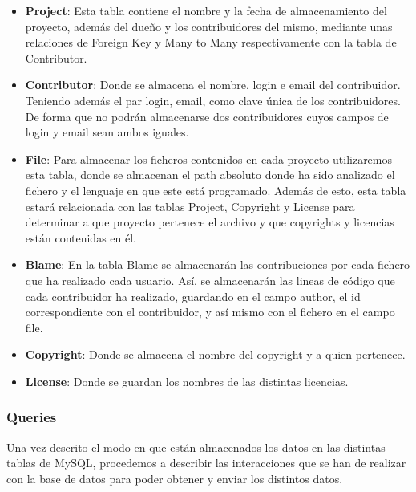 \documentclass[a4paper, spanish, 12pt]{book}
\begin{document}
\begin{itemize}

\item \textbf{Project}: Esta tabla contiene el nombre y la fecha de almacenamiento
del proyecto, adem\'as del due\~no y los contribuidores del mismo, mediante unas relaciones
de Foreign Key y Many to Many respectivamente con la tabla de Contributor.

\item \textbf{Contributor}: Donde se almacena el nombre, login e email del contribuidor.
Teniendo adem\'as el par login, email, como clave \'unica de los contribuidores. De forma
que no podr\'an almacenarse dos contribuidores cuyos campos de login y email sean
ambos iguales.

\item \textbf{File}: Para almacenar los ficheros contenidos en cada proyecto
utilizaremos esta tabla, donde se almacenan el path absoluto donde ha sido analizado
el fichero y el lenguaje en que este est\'a programado. Adem\'as de esto, esta tabla
estar\'a relacionada con las tablas Project, Copyright y License para determinar
a que proyecto pertenece el archivo y que copyrights y licencias est\'an contenidas
en \'el.

\item \textbf{Blame}: En la tabla Blame se almacenar\'an las contribuciones por cada
fichero que ha realizado cada usuario. As\'i, se almacenar\'an las lineas de
c\'odigo que cada contribuidor ha realizado, guardando en el campo author, el id correspondiente con
el contribuidor, y as\'i mismo con el fichero en el campo file.

\item \textbf{Copyright}: Donde se almacena el nombre del copyright y a quien pertenece.

\item \textbf{License}: Donde se guardan los nombres de las distintas licencias.

\end{itemize}

\subsubsection*{Queries}
\label{subsubsec:queries}

Una vez descrito el modo en que est\'an almacenados los datos en las distintas
tablas de MySQL, procedemos a describir las interacciones que se han de realizar
con la base de datos para poder obtener y enviar los distintos datos.
\end{document}
